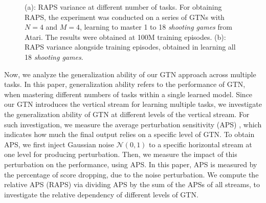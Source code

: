 \documentclass[letterpaper]{article} %
\begin{document}
\begin{figure}
  \centering
  \caption{
    (a): RAPS variance at different number of tasks.
    For obtaining RAPS, the experiment was conducted on a series of GTNs with $N=4$ and $M=4$, learning to master 1 to 18 \textit{shooting games} from Atari. The results were obtained at 100M training episodes.
    (b): RAPS variance alongside training episodes, obtained in learning all 18 \textit{shooting games}.
  }
\end{figure}

Now, we analyze the generalization ability of our GTN approach across multiple tasks. In this paper, generalization ability refers to the performance of GTN, when mastering different numbers of tasks within a single learned model.
Since our GTN introduces the vertical stream for learning multiple tasks, we investigate the generalization ability of GTN at different levels of the vertical stream.
For such investigation, we measure the average perturbation sensitivity (APS) \cite{rusu2016progressive}, which indicates how much the final output relies on a specific level of GTN.
To obtain APS, we first inject Gaussian noise $\mathcal{N}(0,1)$ to a specific horizontal stream at one level for producing perturbation.
Then, we measure the impact of this perturbation on the performance, using APS.
In this paper, APS is measured by the percentage of score dropping, due to the noise perturbation. We compute the relative APS (RAPS) via dividing APS by the sum of the APSs of all streams, to investigate the relative dependency of different levels of GTN.
\end{document}
